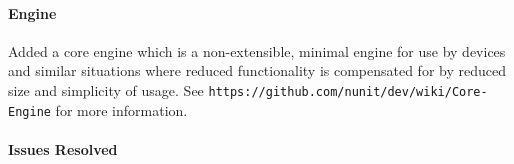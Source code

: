 \paragraph*{Engine}


\begin{DoxyItemize}
\item Added a core engine which is a non-\/extensible, minimal engine for use by devices and similar situations where reduced functionality is compensated for by reduced size and simplicity of usage. See {\tt https\+://github.\+com/nunit/dev/wiki/\+Core-\/\+Engine} for more information.
\end{DoxyItemize}

\paragraph*{Issues Resolved}


